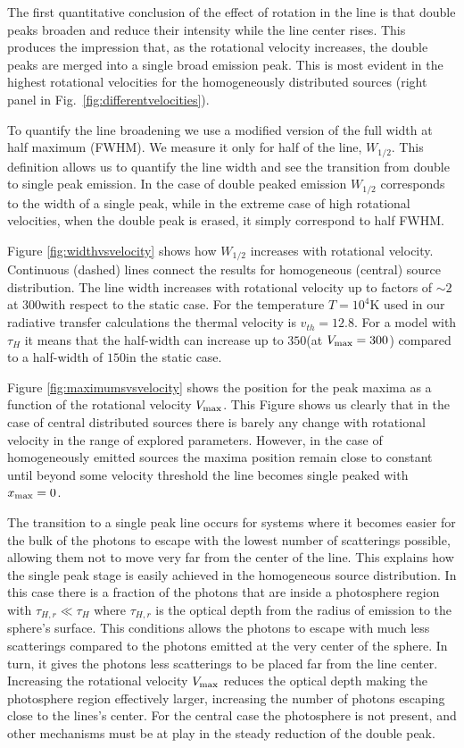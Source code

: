 \documentclass[usenatbib]{mn2e}
\newcommand{\ly}{{\ifmmode{{\rm Ly}\alpha~}\else{Ly$\alpha$~}\fi}}
\newcommand{\kms}{{\ifmmode{{\mathrm{\,km\ s}^{-1}}}\else{\,km~s$^{-1}$}\fi}}
\begin{document}
The first quantitative conclusion of the effect of rotation in the
\ly line is that double peaks broaden and reduce their intensity
while the line center rises. This produces the impression that, as the
rotational velocity increases, the double peaks are merged into a
single broad emission peak. This is most evident in the highest
rotational velocities for the homogeneously distributed sources
(right panel in Fig.~\ref{fig:differentvelocities}). 

To quantify the line broadening we use a modified version of the full
width at half maximum (FWHM). We measure it only for half of
the line, $W_{1/2}$. This definition allows us to quantify the line
width and see the transition from double to single peak emission.  In the
case of double peaked emission $W_{1/2}$ corresponds to the width of a
single peak, while in the extreme case of high rotational velocities,
when the double peak is erased, it simply correspond to half FWHM.  

Figure \ref{fig:widthvsvelocity} shows how $W_{1/2}$ increases with
rotational velocity. Continuous (dashed) lines connect the results for
homogeneous (central) source distribution. The line width increases
with rotational velocity up to factors of $\sim 2$ at $300$\kms with
respect to the static case. For the temperature $T=10^4$K used in our
radiative transfer calculations the thermal velocity is
$v_{th}=12.8$\kms. For a model with $\tau_{H}$ it means that the
half-width can increase up to $350$\kms (at $V_{\rm max}=300$\kms)
compared to a half-width of $150$\kms in the static case.  


Figure \ref{fig:maximumsvsvelocity} shows the position for the peak
maxima as a function of the rotational velocity $V_{\rm max}$. This
Figure shows us clearly that in the case of central distributed
sources there is barely any change with rotational velocity in the
range of explored parameters. However, in the case of
homogeneously emitted sources the maxima position remain close to
constant until beyond some velocity threshold the line becomes single
peaked with $x_{\rm max}=0$. 

The transition to a single peak line occurs for systems
where it  becomes easier for the bulk of the photons to escape with the lowest
number of scatterings possible, allowing them not to move very far
from the center of the line. This explains how the single peak stage
is easily achieved in the homogeneous source distribution. In this
case there is a fraction of the photons that are inside a photosphere
region with $\tau_{H,r}\ll \tau_{H}$ where $\tau_{H,r}$ is the optical
depth from the radius of emission to the sphere's surface. This
conditions allows the photons to escape with much less scatterings
compared to the photons emitted at the very center of the sphere. In
turn, it gives the photons less scatterings to be placed far from the
line center. Increasing the rotational velocity $V_{\rm max}$ reduces
the optical depth making the photosphere region effectively larger,
increasing the number of photons escaping close to the lines's
center. For the central case the photosphere is not present, and other
mechanisms must be at play in the steady reduction of the double peak.  
\end{document}
